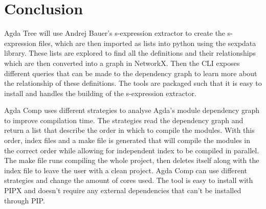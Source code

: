 
\section{Conclusion}

Agda Tree will use Andrej Bauer's s-expression extractor to create the
s-expression files, which are then imported as lists into python using the
sexpdata library. These lists are explored to find all the definitions and
their relationships which are then converted into a graph in NetworkX.  Then
the CLI exposes different queries that can be made to the dependency graph to
learn more about the relationship of these definitions. The tools are packaged
such that it is easy to install and handles the building of the s-expression
extractor.

Agda Comp uses different strategies to analyse Agda's module dependency graph
to improve compilation time. The strategies read the dependency graph and
return a list that describe the order in which to compile the modules. With
this order, index files and a make file is generated that will compile the
modules in the correct order while allowing for independent index to be
compiled in parallel. The make file runs compiling the whole project, then
deletes itself along with the index file to leave the user with a clean
project. Agda Comp can use different strategies and change the amount of cores
used. The tool is easy to install with PIPX and doesn't require any external
dependencies that can't be installed through PIP.


